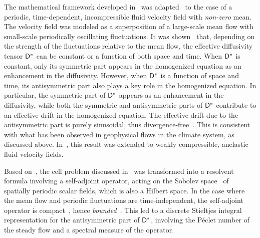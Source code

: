 \documentclass[amsa]{ipart}
\begin{document}
The mathematical framework developed in~\cite{McLaughlin:SIAM_JAM:780}
was
adapted~\cite{Pavliotis:PHD_Thesis,McLaughlin:Forest:PF:1999:880,Majda:Kramer:1999:book} 
to the case of a periodic, 
time-dependent, incompressible fluid velocity field with \emph{non-zero}
mean. The velocity field was modeled as a superposition of a
large-scale mean flow with small-scale periodically oscillating 
fluctuations. It was shown~\cite{Pavliotis:PHD_Thesis} that, depending
on the strength of the fluctuations relative to the mean flow, the
effective diffusivity tensor $\mathsf{D}^*$ can be constant or a function of
both space and time. When $\mathsf{D}^*$ is constant, only its symmetric part
appears in the homogenized equation as an enhancement in the
diffusivity. However, when $\mathsf{D}^*$ is a function of space and time,
its antisymmetric part also plays a key role in the homogenized
equation. In particular, the symmetric part of $\mathsf{D}^*$ appears as an
enhancement in the diffusivity, while both the symmetric and
antisymmetric parts of $\mathsf{D}^*$ contribute to an effective drift in the
homogenized equation. The effective drift due to the antisymmetric
part is purely sinusoidal, thus
divergence-free~\cite{Pavliotis:PHD_Thesis}. This is consistent with
what has been observed in geophysical flows in the climate system, as
discussed above. In~\cite{McLaughlin:Forest:PF:1999:880}, this result
was extended to weakly compressible, anelastic fluid velocity fields.



Based on~\cite{Bhattacharya:AAP:1999:951}, the cell problem discussed
in~\cite{Pavliotis:PHD_Thesis} was transformed into a resolvent formula
involving a self-adjoint operator, acting on the Sobolev
space~\cite{McOwen:2003:PDE,Folland:95:PDEs} of spatially periodic scalar
fields, which is also a Hilbert space. In the case where the mean flow
and periodic fluctuations are time-independent, the
self-adjoint operator is compact~\cite{Bhattacharya:AAP:1999:951},
hence \emph{bounded}~\cite{Stakgold:BVP:2000}. This led to a
discrete Stieltjes integral representation for the
antisymmetric part of $\mathsf{D}^*$, involving the P\'{e}clet number of the
steady flow and a spectral measure of the operator.    
\end{document}

